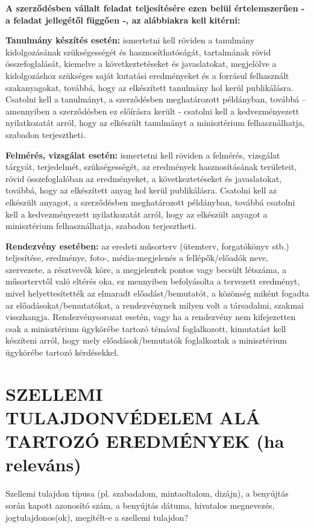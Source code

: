 \documentclass[graybox,envcountchap,sectrefs]{svmono}
\begin{document}
\textbf{A szerződésben vállalt feladat teljesítésére ezen belül értelemszerűen - a feladat jellegétől függően -, az alábbiakra kell kitérni:}

\begin{svgraybox}
	\textbf{Tanulmány készítés esetén:} ismertetni kell röviden a tanulmány kidolgozásának szükségességét és hasznosíthatóságát, tartalmának rövid összefoglalását, kiemelve a következtetéseket és javaslatokat, megjelölve a kidolgozáshoz szükséges saját kutatási eredményeket és a forrásul felhasznált szakanyagokat, továbbá, hogy az elkészített tanulmány hol kerül publikálásra. Csatolni kell a tanulmányt, a szerződésben meghatározott példányban, továbbá – amennyiben a szerződésben ez előírásra került - csatolni kell a kedvezményezett nyilatkozatát arról, hogy az elkészült tanulmányt a minisztérium felhasználhatja, szabadon terjesztheti.
\end{svgraybox}

\begin{svgraybox}
	\textbf{Felmérés, vizsgálat esetén:} ismertetni kell röviden a felmérés, vizsgálat tárgyát, terjedelmét, szükségességét, az eredmények hasznosításának területeit, rövid összefoglalóban az eredményeket, a következtetéseket és javaslatokat, továbbá, hogy az elkészített anyag hol kerül publikálásra. Csatolni kell az elkészült anyagot, a szerződésben meghatározott példányban, továbbá csatolni kell a kedvezményezett nyilatkozatát arról, hogy az elkészült anyagot a minisztérium felhasználhatja, szabadon terjesztheti.
\end{svgraybox}

\begin{svgraybox}
	\textbf{Rendezvény esetében:} az eredeti műsorterv (ütemterv, forgatókönyv stb.) teljesítése, eredménye, foto-, média-megjelenés a fellépők/előadók neve, szervezete, a résztvevők köre, a megjelentek pontos vagy becsült létszáma, a műsortervtől való eltérés oka, ez mennyiben befolyásolta a tervezett eredményt, mivel helyettesítették az elmaradt előadást/bemutatót, a közönség miként fogadta az előadásokat/bemutatókat, a rendezvénynek milyen volt a társadalmi, szakmai visszhangja. Rendezvénysorozat esetén, vagy ha a rendezvény nem kifejezetten csak a minisztérium ügykörébe tartozó témával foglalkozott, kimutatást kell készíteni arról, hogy mely előadások/bemutatók foglalkoztak a minisztérium ügykörébe tartozó kérdésekkel.
\end{svgraybox}


\section{SZELLEMI TULAJDONVÉDELEM ALÁ TARTOZÓ EREDMÉNYEK (ha releváns)}
Szellemi tulajdon típusa (pl. szabadalom, mintaoltalom, dizájn), a benyújtás során kapott azonosító szám, a benyújtás dátuma, hivatalos megnevezés, jogtulajdonos(ok), megítélt-e a szellemi tulajdon?
\end{document}
